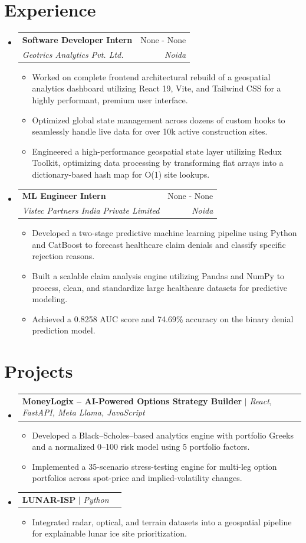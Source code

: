\documentclass[letterpaper,10pt]{article}
\makeatletter
\newcommand{\resumeItem}[1]{
  \item\small{
    {#1 \vspace{-2pt}}
  }
}
\newcommand{\resumeSubheading}[4]{
  \vspace{-2pt}\item
    \begin{tabular*}{0.97\textwidth}[t]{l@{\extracolsep{\fill}}r}
      \textbf{#1} & #2 \\
      \textit{\small#3} & \textit{\small #4} \\
    \end{tabular*}\vspace{-7pt}
}
\newcommand{\resumeProjectHeading}[2]{
    \item
    \begin{tabular*}{0.97\textwidth}{l@{\extracolsep{\fill}}r}
      \small#1 & #2 \\
    \end{tabular*}\vspace{-7pt}
}
\newcommand{\resumeSubHeadingListStart}{\begin{itemize}[leftmargin=0.15in, label={}]}
\newcommand{\resumeSubHeadingListEnd}{\end{itemize}}
\newcommand{\resumeItemListStart}{\begin{itemize}}
\newcommand{\resumeItemListEnd}{\end{itemize}\vspace{-5pt}}
\makeatother
\begin{document}
\section{Experience}
  \resumeSubHeadingListStart
          \resumeSubheading
        {Software Developer Intern}{None - None}
        {Geotrics Analytics Pvt. Ltd.}{Noida}
        \resumeItemListStart
                      \resumeItem{Worked on complete frontend architectural rebuild of a geospatial analytics dashboard utilizing React 19, Vite, and Tailwind CSS for a highly performant, premium user interface.}
                      \resumeItem{Optimized global state management across dozens of custom hooks to seamlessly handle live data for over 10k active construction sites.}
                      \resumeItem{Engineered a high-performance geospatial state layer utilizing Redux Toolkit, optimizing data processing by transforming flat arrays into a dictionary-based hash map for O(1) site lookups.}
                  \resumeItemListEnd
          \resumeSubheading
        {ML Engineer Intern}{None - None}
        {Vistec Partners India Private Limited}{Noida}
        \resumeItemListStart
                      \resumeItem{Developed a two-stage predictive machine learning pipeline using Python and CatBoost to forecast healthcare claim denials and classify specific rejection reasons.}
                      \resumeItem{Built a scalable claim analysis engine utilizing Pandas and NumPy to process, clean, and standardize large healthcare datasets for predictive modeling.}
                      \resumeItem{Achieved a 0.8258 AUC score and 74.69\% accuracy on the binary denial prediction model.}
                  \resumeItemListEnd
      \resumeSubHeadingListEnd

\section{Projects}
    \resumeSubHeadingListStart
              \resumeProjectHeading
          {\textbf{MoneyLogix – AI-Powered Options Strategy Builder} $|$ \emph{React, FastAPI, Meta Llama, JavaScript}}{}
          \resumeItemListStart
                          \resumeItem{Developed a Black–Scholes–based analytics engine with portfolio Greeks and a normalized 0–100 risk model using 5 portfolio factors.}
                          \resumeItem{Implemented a 35-scenario stress-testing engine for multi-leg option portfolios across spot-price and implied-volatility changes.}
                      \resumeItemListEnd
              \resumeProjectHeading
          {\textbf{LUNAR-ISP} $|$ \emph{Python}}{}
          \resumeItemListStart
                          \resumeItem{Integrated radar, optical, and terrain datasets into a geospatial pipeline for explainable lunar ice site prioritization.}
                      \resumeItemListEnd
          \resumeSubHeadingListEnd
\end{document}
